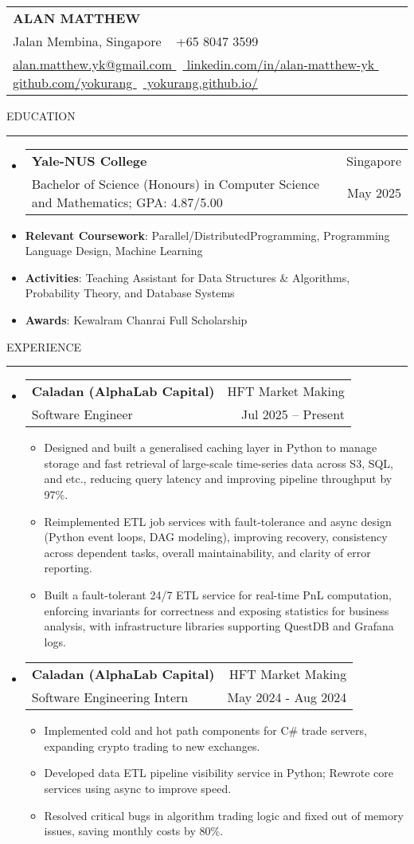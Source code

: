\documentclass[letterpaper, 11pt]{article}
\makeatletter
\def\sectionlineskip{\medskip}
\def\sectionskip{\medskip}
\def\namesize{\LARGE}
\newcommand{\ResumeHeader}[6]{
  \noindent
  \begin{tabularx}{\textwidth}{>{\centering\arraybackslash}X}
    \namesize\MakeUppercase{\textbf{\fullname}} \\
    #1 \textbar\ #2 \\
    #3 \textbar\ #4 \textbar\ #5 \textbar\ #6 \\
  \end{tabularx}
}
\def \fullname { Alan Matthew }
\def \linkedinlink { https://www.linkedin.com/in/alan-matthew-yk }
\def \linkedintext { linkedin.com/in/alan-matthew-yk }
\def \phonenumber { +65 8047 3599 }
\def \githublink { https://github.com/yokurang }
\def \githubtext { github.com/yokurang }
\def \emaillink { mailto:alan.matthew.yk@gmail.com }
\def \emailtext { alan.matthew.yk@gmail.com }
\def \websitelink { https://yokurang.github.io/ }
\def \websitetext { yokurang.github.io/ }
\def \address { 9 Jalan Membina, Singapore }
\def \headertype {\ResumeHeader}
\def \linkedin {\href{\linkedinlink}{\linkedintext}}
\def \phone {{\phonenumber}}
\def \email {\href{\emaillink}{\emailtext}}
\def \github {\href{\githublink}{\githubtext}}
\def \website {\href{\websitelink}{\websitetext}}
\newcommand{\SectionHeading}[1]{
  \sectionskip
  \raggedright\raggedbottom\MakeUppercase{\large{#1}}
  \sectionlineskip
  \hrule
  \color{black}
}
\newcommand{\ResumeEntryTSDL}[4]{
  \vspace{1pt}\item
    \begin{tabular*}{\textwidth}[t]{l@{\extracolsep{\fill}}r} 
      \textbf{#1} & #2 \\
      #3 & #4 \\
    \end{tabular*}\vspace{-2.835pt} %
}
\newcommand{\ResumeItem}[2]{
  \item{
    \textbf{#1}{: #2 \vspace{-2.835pt}}
  }
}
\newcommand{\ResumeItemDefault}[1]{
  \item{
    #1 \vspace{-2.835pt}
  }
}
\newcommand{\ResumeSubItem}[2]{\ResumeItem{#1}{#2}\vspace{-2.835pt}}
\newcommand{\ResumeEntryStart}{\begin{itemize}[leftmargin=0mm, label={}]}
\newcommand{\ResumeEntryEnd}{\end{itemize}\vspace{-2.835pt}} %
\newcommand{\ResumeItemListStart}{\begin{itemize}[leftmargin=5mm, label=$\bullet$, itemsep=1mm, parsep=1mm]} %
\newcommand{\ResumeItemListEnd}{\end{itemize}}
\makeatother
\begin{document}
  \headertype{\address}{\phone}{\email}{\linkedin}{\github}{\website}
  
  \SectionHeading{Education}
  \ResumeEntryStart
    \ResumeEntryTSDL{Yale-NUS College} {Singapore}
    {Bachelor of Science (Honours) in Computer Science and Mathematics; GPA: 4.87/5.00} {May 2025}
    \ResumeSubItem{Relevant Coursework}{Parallel/DistributedProgramming, Programming Language Design, Machine Learning}
    \ResumeSubItem{Activities}{Teaching Assistant for Data Structures \& Algorithms, Probability Theory, and Database Systems}
    \ResumeSubItem{Awards}{Kewalram Chanrai Full Scholarship}
  \ResumeEntryEnd

  \vspace{5pt}

  \SectionHeading{Experience}

  \ResumeEntryStart
  \ResumeEntryTSDL{Caladan (AlphaLab Capital)}{HFT Market Making}{Software Engineer}{Jul 2025 – Present}
  \ResumeItemListStart
  \ResumeItemDefault{Designed and built a generalised caching layer in Python to manage storage and fast retrieval of large-scale time-series data across S3, SQL, and etc., reducing query latency and improving pipeline throughput by 97\%.}
  \ResumeItemDefault{Reimplemented ETL job services with fault-tolerance and async design (Python event loops, DAG modeling), improving recovery, consistency across dependent tasks, overall maintainability, and clarity of error reporting.}
  \ResumeItemDefault{Built a fault-tolerant 24/7 ETL service for real-time PnL computation, enforcing invariants for correctness and exposing statistics for business analysis, with infrastructure libraries supporting QuestDB and Grafana logs.}
  \ResumeItemListEnd
  \ResumeEntryEnd


  \ResumeEntryStart
  \ResumeEntryTSDL{Caladan (AlphaLab Capital)}{HFT Market Making}{Software Engineering Intern}{May 2024 - Aug 2024}
  \ResumeItemListStart
  \ResumeItemDefault{Implemented cold and hot path components for C\# trade servers, expanding crypto trading to new exchanges.}
  \ResumeItemDefault{Developed data ETL pipeline visibility service in Python; Rewrote core services using async to improve speed.}
  \ResumeItemDefault{Resolved critical bugs in algorithm trading logic and fixed out of memory issues, saving monthly costs by 80\%.}
  \ResumeItemListEnd
  \ResumeEntryEnd
\end{document}
